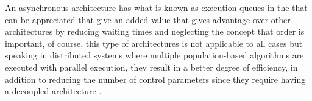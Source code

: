 \documentclass[runningheads]{llncs}
\begin{document}




An asynchronous architecture has what is known as execution queues in the that
can be appreciated that give an added value that gives advantage over other
architectures by reducing waiting times and neglecting the concept that order is
important, of course, this type of architectures is not applicable to all cases
but speaking in distributed systems where multiple population-based algorithms
are executed with parallel execution, they result in a better degree of
efficiency, in addition to reducing the number of control parameters since they
require having a decoupled architecture \cite{Ma2019,Santander-jim2018}.
\end{document}

